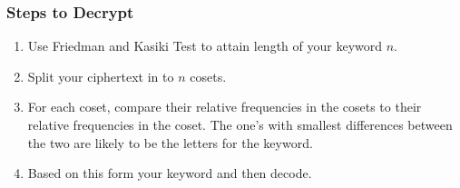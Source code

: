 \documentclass[11pt]{article}
\begin{document}
\subsubsection{Steps to Decrypt}
\label{sec-3-2-5}
\begin{enumerate}
\item Use Friedman and Kasiki Test to attain length of your keyword $n$.
\label{sec-3-2-5-1}
\item Split your ciphertext in to $n$ cosets.
\label{sec-3-2-5-2}
\item For each coset, compare their relative frequencies in the cosets to their relative frequencies in the coset. The one's with smallest differences between the two are likely to be the letters for the keyword.
\label{sec-3-2-5-3}
\item Based on this form your keyword and then decode.
\label{sec-3-2-5-4}
\end{enumerate}
\end{document}
